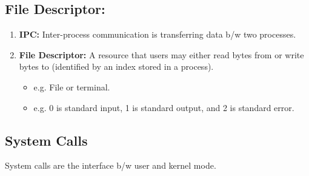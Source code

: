 \documentclass[twoside]{article}
\begin{document}
\subsection{File Descriptor:}
\begin{definition}
    \begin{enumerate}
        \item \textbf{IPC:} Inter-process communication is transferring data b/w two processes.
        \item \textbf{File Descriptor:} A resource that users may either read bytes from or write bytes to (identified by an index stored in a process).
        \begin{itemize}
            \item e.g. File or terminal.
            \item e.g. 0 is standard input, 1 is standard output, and 2 is standard error.
        \end{itemize}
    \end{enumerate}
\end{definition}

\subsection{System Calls}
\begin{definition}
    System calls are the interface b/w user and kernel mode.
\end{definition}
\end{document}
